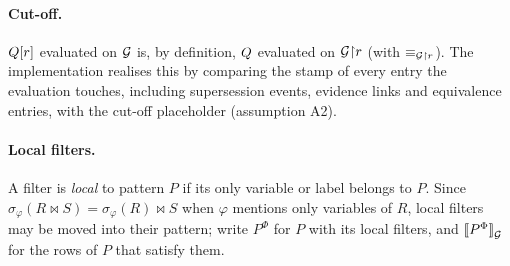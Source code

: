 \paragraph{Cut-off.}
$Q[r]$ evaluated on $\mathcal G$ is, by definition, $Q$ evaluated on $\mathcal G{\restriction}r$ (with
$\equiv_{\mathcal G{\restriction}r}$). The implementation realises this by comparing the stamp of every
entry the evaluation touches, including supersession events, evidence links and equivalence
entries, with the cut-off placeholder (assumption A2).

\paragraph{Local filters.}
A filter is \emph{local} to pattern $P$ if its only variable or label belongs to $P$. Since
$\sigma_\varphi(R\bowtie S)=\sigma_\varphi(R)\bowtie S$ when $\varphi$ mentions only variables of
$R$, local filters may be moved into their pattern; write $P^\Phi$ for $P$ with its local filters,
and $[\![P^\Phi]\!]_{\mathcal G}^{}$ for the rows of $P$ that satisfy them.
